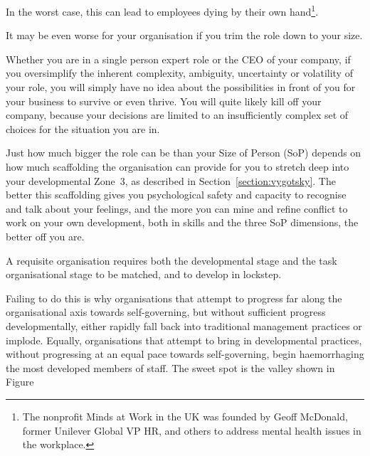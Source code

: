 In the worst case, this can lead to employees dying by their own hand\footnote{The nonprofit Minds at Work  in the UK was founded by Geoff McDonald,  former Unilever Global VP HR, and others to address mental health issues in the workplace.}.


It may be even worse for your organisation if you trim the role down to your size. 


Whether you are in a single person expert role or the CEO of your company, if you oversimplify the inherent complexity, ambiguity, uncertainty or volatility of your role, you will simply have no idea about the possibilities  in front of you for your business to survive or even thrive. You will quite likely kill off your company, because your decisions are limited to an insufficiently complex set of choices for the situation you are in.


Just how much bigger the role can be than your Size of Person (SoP) depends on how much scaffolding the organisation can provide for you to stretch deep into your developmental Zone~3, as described in Section~\ref{section:vygotsky}. The better this scaffolding gives you psychological safety and capacity to recognise and talk about your feelings, and the more you can mine and refine conflict to work on your own development, both in skills and the three SoP dimensions, the better off you are.


A requisite organisation requires both the developmental stage and the task organisational stage to be matched, and to develop in lockstep. 


Failing to do this is why organisations that attempt to progress far along the organisational axis towards self-governing, but without sufficient progress developmentally, either rapidly fall back into traditional management practices or implode. Equally, organisations that attempt to bring in developmental practices, without progressing at an equal pace towards self-governing, begin haemorrhaging the most developed members of staff. The sweet spot is the valley shown in Figure%




